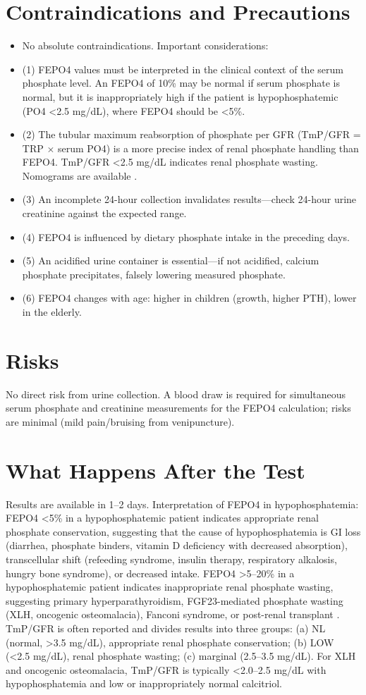 \section*{Contraindications and Precautions}
\begin{itemize}
  \item No absolute contraindications. Important considerations:
  \item (1) FEPO4 values must be interpreted in the clinical context of the serum phosphate level. An FEPO4 of 10\% may be normal if serum phosphate is normal, but it is inappropriately high if the patient is hypophosphatemic (PO4 <2.5 mg/dL), where FEPO4 should be <5\%.
  \item (2) The tubular maximum reabsorption of phosphate per GFR (TmP/GFR = TRP $\times$ serum PO4) is a more precise index of renal phosphate handling than FEPO4. TmP/GFR <2.5 mg/dL indicates renal phosphate wasting. Nomograms are available \cite{walton1975nomogram}.
  \item (3) An incomplete 24-hour collection invalidates results---check 24-hour urine creatinine against the expected range.
  \item (4) FEPO4 is influenced by dietary phosphate intake in the preceding days.
  \item (5) An acidified urine container is essential---if not acidified, calcium phosphate precipitates, falsely lowering measured phosphate.
  \item (6) FEPO4 changes with age: higher in children (growth, higher PTH), lower in the elderly.
\end{itemize}
\section*{Risks}
No direct risk from urine collection. A blood draw is required for simultaneous serum phosphate and creatinine measurements for the FEPO4 calculation; risks are minimal (mild pain/bruising from venipuncture).

\section*{What Happens After the Test}
Results are available in 1--2 days. Interpretation of FEPO4 in hypophosphatemia: FEPO4 <5\% in a hypophosphatemic patient indicates appropriate renal phosphate conservation, suggesting that the cause of hypophosphatemia is GI loss (diarrhea, phosphate binders, vitamin D deficiency with decreased absorption), transcellular shift (refeeding syndrome, insulin therapy, respiratory alkalosis, hungry bone syndrome), or decreased intake. FEPO4 >5--20\% in a hypophosphatemic patient indicates inappropriate renal phosphate wasting, suggesting primary hyperparathyroidism, FGF23-mediated phosphate wasting (XLH, oncogenic osteomalacia), Fanconi syndrome, or post-renal transplant \cite{imel2012approach}. TmP/GFR is often reported and divides results into three groups: (a) NL (normal, >3.5 mg/dL), appropriate renal phosphate conservation; (b) LOW (<2.5 mg/dL), renal phosphate wasting; (c) marginal (2.5--3.5 mg/dL). For XLH and oncogenic osteomalacia, TmP/GFR is typically <2.0--2.5 mg/dL with hypophosphatemia and low or inappropriately normal calcitriol.

